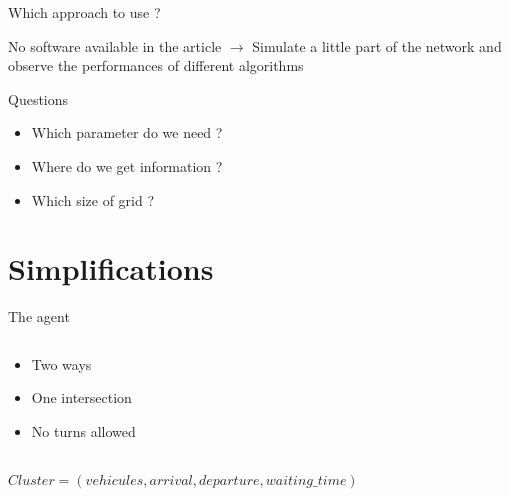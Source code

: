 \documentclass[]{beamer}
\begin{document}
\begin{frame}{Which approach to use ?}
 \begin{block}{No software available in the article}
 $\rightarrow$ Simulate a little part of the network and observe the performances of different algorithms
 \end{block}
 
 \begin{block}{Questions}
  \begin{itemize}
   \item Which parameter do we need ?
   \item Where do we get information ?
   \item Which size of grid ?
  \end{itemize} 
 \end{block}
\end{frame}

\section{Simplifications}
\begin{frame}{The agent}

 \begin{columns}
  \begin{column}[c]{4cm}
   \begin{itemize}
    \item Two ways
    \item One intersection
    \item No turns allowed
   \end{itemize}
  \end{column}
  \begin{column}[c]{6cm}
   \begin{figure}
   \end{figure}
  \end{column}
 \end{columns}
 \vspace{1cm}
 
 \centering
 $Cluster = (vehicules, arrival, departure, waiting\_time)$
\end{frame}
\end{document}
